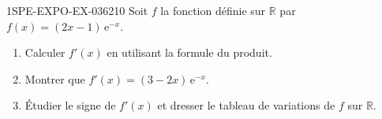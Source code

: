 \begin{exercice}{1SPE-EXPO-EX-036}{2}{10}
Soit $f$ la fonction définie sur $\mathbb{R}$ par $f(x) = (2x-1)\,\mathrm{e}^{-x}$.
\begin{enumerate}
\item Calculer $f'(x)$ en utilisant la formule du produit.
\item Montrer que $f'(x) = (3-2x)\,\mathrm{e}^{-x}$.
\item Étudier le signe de $f'(x)$ et dresser le tableau de variations de $f$ sur $\mathbb{R}$.
\end{enumerate}
\end{exercice}
